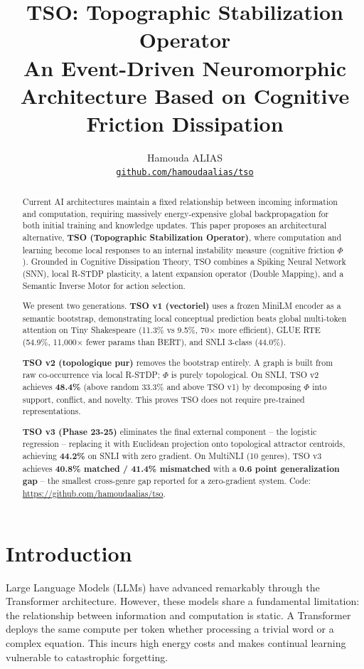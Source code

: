 \documentclass{article}
\title{TSO: Topographic Stabilization Operator\\
\large An Event-Driven Neuromorphic Architecture Based on Cognitive Friction Dissipation}
\author{
  Hamouda ALIAS\\
  \texttt{\href{https://github.com/hamoudaalias/tso}{github.com/hamoudaalias/tso}}
}
\begin{document}
\maketitle

\begin{abstract}
Current AI architectures maintain a fixed relationship between incoming information and computation, requiring massively energy-expensive global backpropagation for both initial training and knowledge updates. This paper proposes an architectural alternative, \textbf{TSO (Topographic Stabilization Operator)}, where computation and learning become local responses to an internal instability measure (cognitive friction $\Phi$). Grounded in Cognitive Dissipation Theory, TSO combines a Spiking Neural Network (SNN), local R-STDP plasticity, a latent expansion operator (Double Mapping), and a Semantic Inverse Motor for action selection.

We present two generations. \textbf{TSO v1 (vectoriel)} uses a frozen MiniLM encoder as a semantic bootstrap, demonstrating local conceptual prediction beats global multi-token attention on Tiny Shakespeare (11.3\% vs 9.5\%, 70$\times$ more efficient), GLUE RTE (54.9\%, 11{,}000$\times$ fewer params than BERT), and SNLI 3-class (44.0\%).

\textbf{TSO v2 (topologique pur)} removes the bootstrap entirely. A graph is built from raw co-occurrence via local R-STDP; $\Phi$ is purely topological. On SNLI, TSO v2 achieves \textbf{48.4\%} (above random 33.3\% and above TSO v1) by decomposing $\Phi$ into support, conflict, and novelty. This proves TSO does not require pre-trained representations.

\textbf{TSO v3 (Phase 23-25)} eliminates the final external component -- the logistic regression -- replacing it with Euclidean projection onto topological attractor centroids, achieving \textbf{44.2\%} on SNLI with zero gradient. On MultiNLI (10 genres), TSO v3 achieves \textbf{40.8\% matched / 41.4\% mismatched} with a \textbf{0.6 point generalization gap} -- the smallest cross-genre gap reported for a zero-gradient system. Code: \url{https://github.com/hamoudaalias/tso}.
\end{abstract}

\section{Introduction}

Large Language Models (LLMs) have advanced remarkably through the Transformer architecture. However, these models share a fundamental limitation: the relationship between information and computation is static. A Transformer deploys the same compute per token whether processing a trivial word or a complex equation. This incurs high energy costs and makes continual learning vulnerable to catastrophic forgetting.
\end{document}
